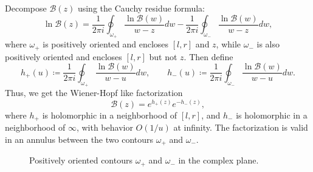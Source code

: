 \documentclass[letterpaper,11pt,oneside,reqno]{article}
\numberwithin{equation}{section}
\theoremstyle{definition}
\begin{document}
Decompose $\mathcal{B}(z)$ using the Cauchy residue formula:
\begin{equation*}
	\ln \mathcal{B}(z)=\frac{1}{2\pi i}\oint_{\omega_+}
	\frac{\ln \mathcal{B}(w)}{w-z}dw-
	\frac{1}{2\pi i}\oint_{\omega_-}
	\frac{\ln \mathcal{B}(w)}{w-z}dw,
\end{equation*}
where $\omega_+$ is positively oriented and encloses $[l,r]$ and $z$,
while $\omega_-$ is also positively oriented and encloses $[l,r]$ but not $z$.
Then define
\begin{equation*}
	h_+(u)\coloneqq \frac{1}{2\pi i}\oint_{\omega_+}
	\frac{\ln \mathcal{B}(w)}{w-u}dw,\qquad 
	h_-(u)\coloneqq \frac{1}{2\pi i}\oint_{\omega_-}
	\frac{\ln \mathcal{B}(w)}{w-u}dw.
\end{equation*}
Thus, we get the Wiener-Hopf like factorization
\begin{equation*}
	\mathcal{B}(z)=e^{h_+(z)}e^{-h_-(z)},
\end{equation*}
where $h_+$ is holomorphic in a neighborhood of $[l,r]$, and 
$h_-$ is holomorphic in a neighborhood of $\infty$, with behavior $O(1/u)$ at infinity.
The factorization is valid in an annulus between the two contours $\omega_+$ and $\omega_-$.

\begin{figure}[htpb]
	\centering
	\caption{Positively oriented contours $\omega_+$ and $\omega_-$ in the complex plane.}
	\label{fig:contours}
\end{figure}
\end{document}
